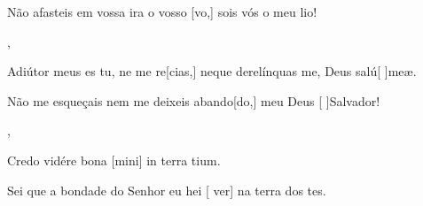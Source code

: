 {    {\item {}Não afasteis em vossa ira o vosso [vo,] sois vós o meu lio!},
  {\item {}Adiútor meus es tu, ne me re[cias,] neque derelínquas me, Deus salú[ ]{me}æ.}%
    {\item {}Não me esqueçais nem me deixeis abando[do,] meu Deus [ ]{Sal}vador!},
  {\item {}Credo vidére bona [mini] in terra tium.}%
    {\item {}Sei que a bondade do Senhor eu hei [ ver] na terra dos tes.}
}